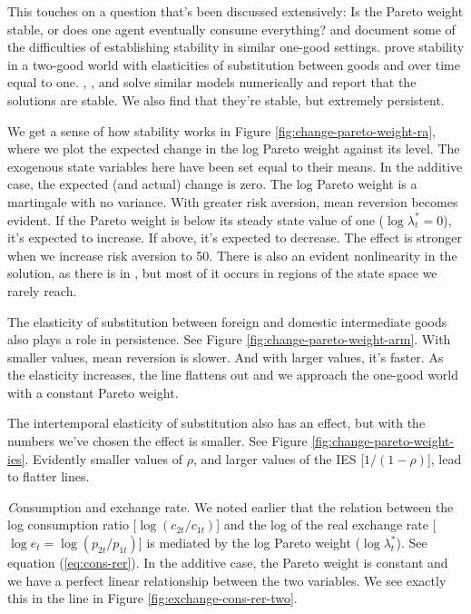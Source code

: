 This touches on a question that's been discussed extensively:
Is the Pareto weight stable, or does one agent eventually consume everything?
\citet{Anderson2005-of} and \citet{Borovicka2016-rr} document some of the difficulties
of establishing stability in similar one-good settings.
\citet{Colacito2011-zp} prove stability in a two-good
world with elasticities of substitution between goods and over time equal to one.
\citet{Colacito2013-yq}, \citet{Kollmann2015-sy}, and \citet{Tretvoll2011-lo,Tretvoll2015-lo,Tretvoll2018-dj}
solve similar models numerically and report that the solutions are stable.
We also find that they're stable, but extremely persistent.

We get a sense of how stability works in Figure \ref{fig:change-pareto-weight-ra},
where we plot the expected change in the log Pareto weight against its level.
The exogenous state variables here have been set equal to their means.
In the additive case, the expected (and actual) change is zero.
The log Pareto weight is a martingale with no variance.
With greater risk aversion, mean reversion becomes evident.
If the Pareto weight is below its steady state value of one ($\log \lambda_t^* = 0$),
it's expected to increase.
If above, it's expected to decrease.
The effect is stronger when we increase risk aversion to 50.
There is also an evident nonlinearity in the solution,
as there is in \citet[Figure 5]{Colacito2011-zp},
but most of it occurs in regions of the state space we rarely reach.


The elasticity of substitution between foreign and domestic intermediate goods
also plays a role in persistence.
See Figure \ref{fig:change-pareto-weight-arm}.
With smaller values, mean reversion is slower.
And with larger values, it's faster.
As the elasticity increases, the line flattens out and we approach
the one-good world with a constant Pareto weight.

The intertemporal elasticity of substitution also has an effect,
but with the numbers we've chosen the effect is smaller.
See Figure \ref{fig:change-pareto-weight-ies}.
Evidently smaller values of $\rho$, and larger values of the IES [$1/(1-\rho)$],
lead to flatter lines.


{\textit Consumption and exchange rate.\/}
We noted earlier that the relation between the log consumption ratio [$\log (c_{2t}/c_{1t})$]
and the log of the real exchange rate [$ \log e_t = \log (p_{2t}/p_{1t}) $]
is mediated by the log Pareto weight ($\log \lambda^*_t$).
See equation (\ref{eq:cons-rer}).
In the additive case, the Pareto weight is constant and we have a
perfect linear relationship between the two variables.
We see exactly this in the line in Figure \ref{fig:exchange-cons-rer-two}.


